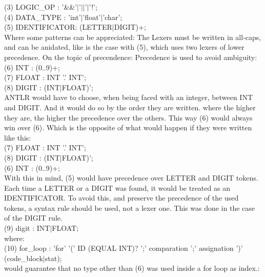 \documentclass[twocolumn,10ptr]{article}
\begin{document}
(3) LOGIC\_OP : '\&\&'\(\mid\)'\(\mid\)\(\mid\)'\(\mid\)'!'; \\

(4)  DATA\_TYPE : 'int'\(\mid\)'float'\(\mid\)'char';\\

(5)  IDENTIFICATOR: (LETTER\(\mid\)DIGIT)+;\\

Where some patterns can be appreciated: The Lexers must be written in all-caps, and can be anidated, like is the case with (5), which uses two lexers of lower precedence.
On the topic of precendence: Precedence is used to avoid ambiguity:\\


(6)  INT : (0..9)+;\\

(7)  FLOAT : INT '.' INT';\\

(8)  DIGIT : (INT\(\mid\)FLOAT)';\\

ANTLR would have to choose, when being faced with an integer, between INT and DIGIT. And it would do so by the order they are written. where the higher they are, the higher the precedence over the others. This way (6) would always win over (6). Which is the opposite of what would happen if they were written like this:\\


(7)  FLOAT : INT '.' INT';\\

(8)  DIGIT : (INT\(\mid\)FLOAT)';\\

(6)  INT : (0..9)+;\\

With this in mind, (5) would have precedence over LETTER and DIGIT tokens. Each time a LETTER or a DIGIT was found, it would be treated as an IDENTIFICATOR.
To avoid this, and preserve the precedence of the used tokens, a syntax rule should be used, not a lexer one. This was done in the case of the DIGIT rule.\\

(9)  digit : INT\(\mid\)FLOAT;\\

where:\\

(10) for\_loop :  'for' '(' ID (EQUAL INT)? ';' comparation ';' assignation ')' (code\_block\(\mid\)stat);\\

would guarantee that no type other than (6) was used inside a for loop as index.:\\
\end{document}
